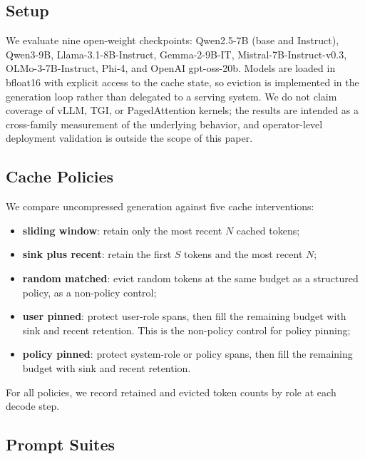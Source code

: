 \documentclass[11pt]{article}
\begin{document}
\subsection{Setup}

We evaluate nine open-weight checkpoints: Qwen2.5-7B (base and Instruct), Qwen3-9B, Llama-3.1-8B-Instruct, Gemma-2-9B-IT, Mistral-7B-Instruct-v0.3, OLMo-3-7B-Instruct, Phi-4, and OpenAI gpt-oss-20b. Models are loaded in bfloat16 with explicit access to the cache state, so eviction is implemented in the generation loop rather than delegated to a serving system. We do not claim coverage of vLLM, TGI, or PagedAttention kernels; the results are intended as a cross-family measurement of the underlying behavior, and operator-level deployment validation is outside the scope of this paper.

\subsection{Cache Policies}

We compare uncompressed generation against five cache interventions:
\begin{itemize}
  \item \textbf{sliding window}: retain only the most recent $N$ cached tokens;
  \item \textbf{sink plus recent}: retain the first $S$ tokens and the most recent $N$;
  \item \textbf{random matched}: evict random tokens at the same budget as a structured policy, as a non-policy control;
  \item \textbf{user pinned}: protect user-role spans, then fill the remaining budget with sink and recent retention. This is the non-policy control for policy pinning;
  \item \textbf{policy pinned}: protect system-role or policy spans, then fill the remaining budget with sink and recent retention.
\end{itemize}
For all policies, we record retained and evicted token counts by role at each decode step.

\subsection{Prompt Suites}
\end{document}
